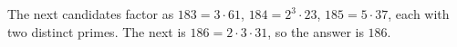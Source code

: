 The next candidates factor as $183=3\cdot61$, $184=2^3\cdot23$, $185=5\cdot37$, each with two distinct primes. The next is $186=2\cdot3\cdot31$, so the answer is $\boxed{186}$.
